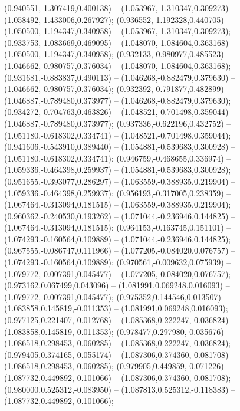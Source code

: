  (0.940551,-1.307419,0.400138) -- (1.053967,-1.310347,0.309273) -- (1.058492,-1.433006,0.267927);
 (0.936552,-1.192328,0.440705) -- (1.050500,-1.194347,0.340958) -- (1.053967,-1.310347,0.309273);
 (0.933753,-1.083669,0.469095) -- (1.048070,-1.084604,0.363168) -- (1.050500,-1.194347,0.340958);
 (0.932133,-0.980977,0.485523) -- (1.046662,-0.980757,0.376034) -- (1.048070,-1.084604,0.363168);
 (0.931681,-0.883837,0.490113) -- (1.046268,-0.882479,0.379630) -- (1.046662,-0.980757,0.376034);
 (0.932392,-0.791877,0.482899) -- (1.046887,-0.789480,0.373977) -- (1.046268,-0.882479,0.379630);
 (0.934272,-0.704763,0.463826) -- (1.048521,-0.701498,0.359044) -- (1.046887,-0.789480,0.373977);
 (0.937336,-0.622196,0.432752) -- (1.051180,-0.618302,0.334741) -- (1.048521,-0.701498,0.359044);
 (0.941606,-0.543910,0.389440) -- (1.054881,-0.539683,0.300928) -- (1.051180,-0.618302,0.334741);
 (0.946759,-0.468655,0.336974) -- (1.059336,-0.464398,0.259937) -- (1.054881,-0.539683,0.300928);
 (0.951655,-0.393077,0.286297) -- (1.063559,-0.388935,0.219904) -- (1.059336,-0.464398,0.259937);
 (0.956193,-0.317005,0.238359) -- (1.067464,-0.313094,0.181515) -- (1.063559,-0.388935,0.219904);
 (0.960362,-0.240530,0.193262) -- (1.071044,-0.236946,0.144825) -- (1.067464,-0.313094,0.181515);
 (0.964153,-0.163745,0.151101) -- (1.074293,-0.160564,0.109889) -- (1.071044,-0.236946,0.144825);
 (0.967555,-0.086747,0.111966) -- (1.077205,-0.084020,0.076757) -- (1.074293,-0.160564,0.109889);
 (0.970561,-0.009632,0.075939) -- (1.079772,-0.007391,0.045477) -- (1.077205,-0.084020,0.076757);
 (0.973162,0.067499,0.043096) -- (1.081991,0.069248,0.016093) -- (1.079772,-0.007391,0.045477);
 (0.975352,0.144546,0.013507) -- (1.083858,0.145819,-0.011353) -- (1.081991,0.069248,0.016093);
 (0.977125,0.221407,-0.012768) -- (1.085368,0.222247,-0.036824) -- (1.083858,0.145819,-0.011353);
 (0.978477,0.297980,-0.035676) -- (1.086518,0.298453,-0.060285) -- (1.085368,0.222247,-0.036824);
 (0.979405,0.374165,-0.055174) -- (1.087306,0.374360,-0.081708) -- (1.086518,0.298453,-0.060285);
 (0.979905,0.449859,-0.071226) -- (1.087732,0.449892,-0.101066) -- (1.087306,0.374360,-0.081708);
 (0.980000,0.525312,-0.083950) -- (1.087813,0.525312,-0.118383) -- (1.087732,0.449892,-0.101066);
